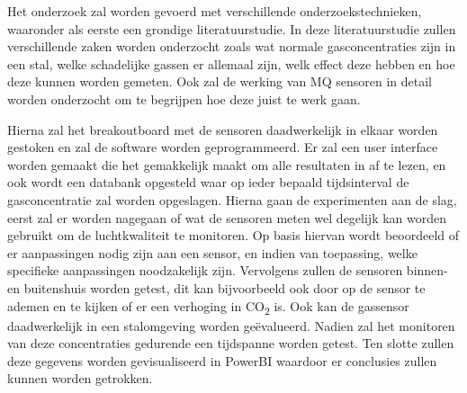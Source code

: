 

Het onderzoek zal worden gevoerd met verschillende onderzoekstechnieken, waaronder als eerste een grondige literatuurstudie. In deze literatuurstudie zullen verschillende zaken worden onderzocht zoals wat normale gasconcentraties zijn in een stal, welke schadelijke gassen er allemaal zijn, welk effect deze hebben en hoe deze kunnen worden gemeten. Ook zal de werking van MQ sensoren in detail worden onderzocht om te begrijpen hoe deze juist te werk gaan.


Hierna zal het breakoutboard met de sensoren daadwerkelijk in elkaar worden gestoken en zal de software worden geprogrammeerd. Er zal een user interface worden gemaakt die het gemakkelijk maakt om alle resultaten in af te lezen, en ook wordt een databank opgesteld waar op ieder bepaald tijdsinterval de gasconcentratie zal worden opgeslagen. Hierna gaan de experimenten aan de slag, eerst zal er worden nagegaan of wat de sensoren meten wel degelijk kan worden gebruikt om de luchtkwaliteit te monitoren. Op basis hiervan wordt beoordeeld of er aanpassingen nodig zijn aan een sensor, en indien van toepassing, welke specifieke aanpassingen noodzakelijk zijn. Vervolgens zullen de sensoren binnen- en buitenshuis worden getest, dit kan bijvoorbeeld ook door op de sensor te ademen en te kijken of er een verhoging in CO\textsubscript{2} is. Ook kan de gassensor daadwerkelijk in een stalomgeving worden geëvalueerd. Nadien zal het monitoren van deze concentraties gedurende een tijdspanne worden getest. Ten slotte zullen deze gegevens worden gevisualiseerd in PowerBI waardoor er conclusies zullen kunnen worden getrokken.

